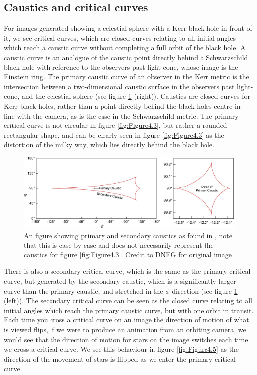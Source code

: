 \documentclass[oneside,openright,frontopenright, singlespacing]{dmathesis}
\begin{document}
\subsection{Caustics and critical curves}\label{subsec:Subsection4.8.2}

\vspace{1em}
	For images generated showing a celestial sphere with a Kerr black hole in front of it, we see critical curves, which are closed curves relating to all initial angles which reach a caustic curve without completing a full orbit of the black hole. A caustic curve is an analogue of the caustic point directly behind a Schwarzschild black hole with reference to the observers past light-cone, whose image is the Einstein ring. The primary caustic curve of an observer in the Kerr metric is the intersection between a two-dimensional caustic surface in the observers past light-cone, and the celestial sphere (see figure \ref{fig:Figure4.4} (right)). Caustics are closed curves for Kerr black holes, rather than a point directly behind the black holes centre in line with the camera, as is the case in the Schwarzschild metric. The primary critical curve is not circular in figure \ref{fig:Figure4.3}, but rather a rounded rectangular shape, and can be clearly seen in figure \ref{fig:Figure4.3} as the distortion of the milky way, which lies directly behind the black hole.

\vspace{1em}
\begin{figure}[!ht]
	\centering
	\includegraphics[width=0.87\linewidth]{img/caustic0}
	\caption{An figure showing primary and secondary caustics as found in \cite{thorne2015gravitational}, note that this is case by case and does not necessarily represent the caustics for figure \ref{fig:Figure4.3}. Credit to DNEG for original image}
	\label{fig:Figure4.4}
\end{figure}

\vspace{1em}
	There is also a secondary critical curve, which is the same as the primary critical curve, but generated by the secondary caustic, which is a significantly larger curve than the primary caustic, and stretched in the $\phi$-direction (see figure \ref{fig:Figure4.4} (left)). The secondary critical curve can be seen as the closed curve relating to all initial angles which reach the primary caustic curve, but with one orbit in transit. Each time you cross a critical curve on an image the direction of motion of what is viewed flips, if we were to produce an animation from an orbiting camera, we would see that the direction of motion for stars on the image switches each time we cross a critical curve. We see this behaviour in figure \ref{fig:Figure4.5} as the direction of the movement of stars is flipped as we enter the primary critical curve.
\end{document}
